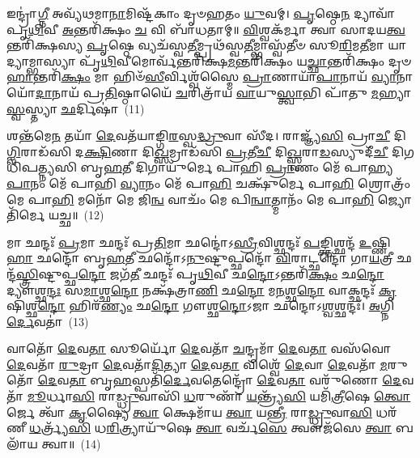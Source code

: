 {\anuvakamend[{𑌪𑍁𑌰𑍁᳴\-\ul{𑌷𑍋} 𑌵\-\ul{𑌯𑌃} 𑌷𑌡𑍍𑌵𑌿𑍞᳴𑌶𑌤𑌿𑌶𑍍𑌚}]}%

𑌇𑌨𑍍𑌦𑍍𑌰𑌾॑\-\ul{𑌗𑍍𑌨𑍀} 𑌅𑌵𑍍𑌯᳴𑌥𑌮𑌾\-\ul{𑌨𑌾}\-𑌮𑌿𑌷𑍍𑌟᳴𑌕𑌾𑌂 𑌦𑍃𑍞𑌹𑌤𑌂 \ul{𑌯𑍁}\-𑌵𑌮𑍍। \ul{𑌪𑍃}\-𑌷𑍍𑌠𑍇\-\ul{𑌨} 𑌦𑍍𑌯𑌾𑌵𑌾᳴𑌪𑍃\-\ul{𑌥𑌿}\-𑌵𑍀 \ul{𑌅}\-𑌨𑍍𑌤𑌰𑌿᳴𑌕𑍍𑌷𑌂 \ul{𑌚} 𑌵𑌿 𑌬𑌾᳴𑌧𑌤𑌾𑌮𑍍॥ \ul{𑌵𑌿}\-𑌶𑍍𑌵𑌕᳴𑌰𑍍𑌮𑌾 𑌤𑍍𑌵𑌾 𑌸𑌾𑌦𑌯\-\ul{𑌤𑍍𑌵}\-𑌨𑍍𑌤𑌰𑌿᳴𑌕𑍍𑌷𑌸𑍍𑌯 \ul{𑌪𑍃}\-𑌷𑍍𑌠𑍇 𑌵𑍍𑌯𑌚᳴𑌸𑍍𑌵\-\ul{𑌤𑍀}\-𑌮𑍍𑌪𑍍𑌰𑌥᳴𑌸𑍍𑌵\-\ul{𑌤𑍀}\-𑌮𑍍𑌭𑌾𑌸𑍍𑌵᳴𑌤𑍀𑍞 𑌸𑍂\-\ul{𑌰𑌿}\-𑌮\-\ul{𑌤𑍀}\-𑌮𑌾 𑌯𑌾 𑌦𑍍𑌯𑌾𑌮𑍍𑌭𑌾𑌸𑍍𑌯𑌾 𑌪𑍃᳴\-\ul{𑌥𑌿}\-𑌵𑍀𑌮𑍋𑌰𑍍𑌵᳴𑌨𑍍𑌤𑌰𑌿᳴𑌕𑍍𑌷\-\ul{𑌮}\-𑌨𑍍𑌤𑌰𑌿᳴𑌕𑍍𑌷𑌂 𑌯\-\ul{𑌚𑍍𑌛𑌾}\-𑌨𑍍𑌤𑌰𑌿᳴𑌕𑍍𑌷𑌂 𑌦𑍃𑍞\-\ul{𑌹𑌾}\-𑌨𑍍𑌤𑌰𑌿᳴\-\ul{𑌕𑍍𑌷𑌂} 𑌮𑌾 𑌹𑌿𑍞᳴\-\ul{𑌸𑍀}\-𑌰𑍍𑌵𑌿𑌶𑍍𑌵᳴𑌸𑍍𑌮𑍈 \ul{𑌪𑍍𑌰𑌾}\-𑌣𑌾𑌯𑌾᳴\-\ul{𑌪𑌾}\-𑌨𑌾𑌯᳴ \ul{𑌵𑍍𑌯𑌾}\-𑌨𑌾𑌯𑍋᳴\-\ul{𑌦𑌾}\-𑌨𑌾𑌯᳴ 𑌪𑍍𑌰\-\ul{𑌤𑌿}\-𑌷𑍍𑌠𑌾𑌯𑍈᳴ \ul{𑌚}\-𑌰𑌿𑌤𑍍𑌰𑌾᳴𑌯 \ul{𑌵𑌾}\-𑌯𑍁\-\ul{𑌸𑍍𑌤𑍍𑌵𑌾}\-𑌭𑌿 𑌪𑌾᳴𑌤𑍁 \ul{𑌮}\-𑌹𑍍𑌯𑌾 \ul{𑌸𑍍𑌵}\-𑌸𑍍𑌤𑍍𑌯𑌾 \ul{𑌛}\-𑌰𑍍𑌦𑌿𑌷𑌾॑~(11)

𑌶𑌨𑍍𑌤᳴𑌮𑍇\-\ul{𑌨} 𑌤𑌯𑌾᳴ \ul{𑌦𑍇}\-𑌵𑌤᳴𑌯𑌾𑌙𑍍𑌗𑌿\-\ul{𑌰}\-𑌸𑍍𑌵\-\ul{𑌦𑍍𑌧𑍍𑌰𑍁}\-𑌵𑌾 𑌸𑍀᳴𑌦। 𑌰𑌾𑌜𑍍𑌞𑍍𑌯᳴\-\ul{𑌸𑌿} 𑌪𑍍𑌰𑌾\-\ul{𑌚𑍀} 𑌦𑌿\-\ul{𑌗𑍍𑌵𑌿}\-𑌰𑌾𑌡᳴𑌸𑌿 𑌦\-\ul{𑌕𑍍𑌷𑌿}\-𑌣𑌾 𑌦𑌿\-\ul{𑌖𑍍𑌸}\-𑌮𑍍𑌰𑌾𑌡᳴𑌸𑌿 \ul{𑌪𑍍𑌰}\-𑌤𑍀\-\ul{𑌚𑍀} 𑌦𑌿\-\ul{𑌖𑍍𑌸𑍍𑌵}\-𑌰𑌾\-\ul{𑌡}\-𑌸𑍍𑌯𑍁𑌦𑍀᳴\-\ul{𑌚𑍀} 𑌦𑌿𑌗𑌧𑌿᳴𑌪𑌤𑍍𑌨𑍍𑌯𑌸𑌿 𑌬𑍃\-\ul{𑌹}\-𑌤𑍀 𑌦𑌿𑌗𑌾𑌯𑍁᳴𑌰𑍍𑌮𑍇 𑌪𑌾𑌹𑌿 \ul{𑌪𑍍𑌰𑌾}\-𑌣𑌂 𑌮𑍇᳴ 𑌪𑌾𑌹𑍍𑌯\-\ul{𑌪𑌾}\-𑌨𑌂 𑌮𑍇᳴ 𑌪𑌾𑌹𑌿 \ul{𑌵𑍍𑌯𑌾}\-𑌨𑌂 𑌮𑍇᳴ 𑌪𑌾\-\ul{𑌹𑌿} 𑌚𑌕𑍍𑌷𑍁᳴𑌰𑍍𑌮𑍇 𑌪𑌾\-\ul{𑌹𑌿} 𑌶𑍍𑌰𑍋𑌤𑍍𑌰𑌂᳴ 𑌮𑍇 𑌪𑌾\-\ul{𑌹𑌿} 𑌮𑌨𑍋᳴ 𑌮𑍇 𑌜𑌿\-\ul{𑌨𑍍𑌵} 𑌵𑌾𑌚𑌂᳴ 𑌮𑍇 𑌪𑌿\-\ul{𑌨𑍍𑌵𑌾}\-𑌤𑍍𑌮𑌾𑌨𑌂᳴ 𑌮𑍇 𑌪𑌾\-\ul{𑌹𑌿} 𑌜𑍍𑌯𑍋𑌤𑌿᳴𑌰𑍍𑌮𑍇 𑌯𑌚𑍍𑌛॥~(12)

{\anuvakamend[{\-\ul{𑌛}\-𑌰𑍍𑌦𑌿𑌷𑌾᳴ 𑌪𑌿\-\ul{𑌨𑍍𑌵} 𑌷𑌟𑍍𑌚᳴}]}%

𑌮𑌾 𑌛𑌨𑍍𑌦𑌃᳴ \ul{𑌪𑍍𑌰}\-𑌮𑌾 𑌛𑌨𑍍𑌦𑌃᳴ 𑌪𑍍𑌰\-\ul{𑌤𑌿}\-𑌮𑌾 𑌛𑌨𑍍𑌦𑍋॑\-𑌽\-\ul{𑌸𑍍𑌰𑍀}\-𑌵𑌿𑌶𑍍𑌛𑌨𑍍𑌦𑌃᳴ \ul{𑌪}\-𑌙𑍍𑌕𑍍𑌤𑌿𑌶𑍍𑌛𑌨𑍍𑌦᳴ \ul{𑌉}\-𑌷𑍍𑌣𑌿\-\ul{𑌹𑌾} 𑌛𑌨𑍍𑌦𑍋᳴ 𑌬𑍃\-\ul{𑌹}\-𑌤𑍀 𑌛𑌨𑍍𑌦𑍋᳴\-𑌽\-\ul{𑌨𑍁}\-𑌷𑍍𑌟𑍁𑌪𑍍𑌛𑌨𑍍𑌦𑍋᳴ \ul{𑌵𑌿}\-𑌰𑌾𑌟𑍍𑌛𑌨𑍍𑌦𑍋᳴ 𑌗𑌾\-\ul{𑌯}\-𑌤𑍍𑌰𑍀 𑌛𑌨𑍍𑌦᳴\-\ul{𑌸𑍍𑌤𑍍𑌰𑌿}\-𑌷𑍍𑌟𑍁𑌪𑍍𑌛\-\ul{𑌨𑍍𑌦𑍋} 𑌜𑌗᳴\-\ul{𑌤𑍀} 𑌛𑌨𑍍𑌦𑌃᳴ 𑌪𑍃\-\ul{𑌥𑌿}\-𑌵𑍀 𑌛\-\ul{𑌨𑍍𑌦𑍋}\-\-𑌽𑌨𑍍𑌤𑌰𑌿᳴\-\ul{𑌕𑍍𑌷𑌂} 𑌛\-\ul{𑌨𑍍𑌦𑍋} 𑌦𑍍𑌯𑍗𑌶𑍍𑌛\-\ul{𑌨𑍍𑌦𑌃} 𑌸\-\ul{𑌮𑌾}\-𑌶𑍍𑌛\-\ul{𑌨𑍍𑌦𑍋} 𑌨𑌕𑍍𑌷᳴𑌤𑍍𑌰𑌾\-\ul{𑌣𑌿} 𑌛\-\ul{𑌨𑍍𑌦𑍋} 𑌮\-\ul{𑌨}\-𑌶𑍍𑌛\-\ul{𑌨𑍍𑌦𑍋} 𑌵𑌾𑌕𑍍𑌛𑌨𑍍𑌦𑌃᳴ \ul{𑌕𑍃}\-𑌷𑌿𑌶𑍍𑌛\-\ul{𑌨𑍍𑌦𑍋} 𑌹𑌿𑌰᳴\-\ul{𑌣𑍍𑌯𑌂} 𑌛\-\ul{𑌨𑍍𑌦𑍋} 𑌗𑍗𑌶𑍍𑌛\-\ul{𑌨𑍍𑌦𑍋}\-\-𑌽𑌜𑌾 𑌛𑌨𑍍𑌦𑍋\-𑌽\-\ul{𑌶𑍍𑌵}\-𑌶𑍍𑌛𑌨𑍍𑌦𑌃᳴। \ul{𑌅}\-𑌗𑍍𑌨𑌿\-\ul{𑌰𑍍𑌦𑍇}\-𑌵𑌤𑌾॑~(13)

𑌵𑌾𑌤𑍋᳴ \ul{𑌦𑍇}\-𑌵\-\ul{𑌤𑌾} 𑌸𑍂𑌰𑍍𑌯𑍋᳴ \ul{𑌦𑍇}\-𑌵𑌤𑌾᳴ \ul{𑌚}\-𑌨𑍍𑌦𑍍𑌰𑌮𑌾᳴ \ul{𑌦𑍇}\-𑌵\-\ul{𑌤𑌾} 𑌵𑌸᳴𑌵𑍋 \ul{𑌦𑍇}\-𑌵𑌤𑌾᳴ \ul{𑌰𑍁}\-𑌦𑍍𑌰𑌾 \ul{𑌦𑍇}\-𑌵𑌤𑌾᳴\-\ul{𑌦𑌿}\-𑌤𑍍𑌯𑌾 \ul{𑌦𑍇}\-𑌵\-\ul{𑌤𑌾} 𑌵𑌿𑌶𑍍𑌵𑍇᳴ \ul{𑌦𑍇}\-𑌵𑌾 \ul{𑌦𑍇}\-𑌵𑌤𑌾᳴ \ul{𑌮}\-𑌰𑍁𑌤𑍋᳴ \ul{𑌦𑍇}\-𑌵\-\ul{𑌤𑌾} 𑌬𑍃\-\ul{𑌹}\-𑌸𑍍𑌪𑌤𑌿᳴\-\ul{𑌰𑍍𑌦𑍇}\-𑌵𑌤𑍇𑌨𑍍𑌦𑍍𑌰𑍋᳴ \ul{𑌦𑍇}\-𑌵\-\ul{𑌤𑌾} 𑌵𑌰𑍁᳴𑌣𑍋 \ul{𑌦𑍇}\-𑌵𑌤𑌾᳴ \ul{𑌮𑍂}\-𑌰𑍍𑌧𑌾\-\ul{𑌸𑌿} 𑌰𑌾\-\ul{𑌡𑍍𑌧𑍍𑌰𑍁}\-𑌵𑌾𑌸𑌿᳴ \ul{𑌧}\-𑌰𑍁𑌣𑌾᳴ \ul{𑌯}\-𑌨𑍍𑌤𑍍𑌰𑍍𑌯᳴\-\ul{𑌸𑌿} 𑌯𑌮𑌿᳴\-\ul{𑌤𑍍𑌰𑍀}\-𑌷𑍇 \ul{𑌤𑍍𑌵𑍋}\-𑌰𑍍𑌜𑍇 𑌤𑍍𑌵𑌾᳴ \ul{𑌕𑍃}\-𑌷𑍍𑌯𑍈 \ul{𑌤𑍍𑌵𑌾} 𑌕𑍍𑌷𑍇𑌮𑌾᳴𑌯 \ul{𑌤𑍍𑌵𑌾} 𑌯\-\ul{𑌨𑍍𑌤𑍍𑌰𑍀} 𑌰𑌾\-\ul{𑌡𑍍𑌧𑍍𑌰𑍁}\-𑌵𑌾\-\ul{𑌸𑌿} 𑌧𑌰᳴𑌣𑍀 \ul{𑌧}\-𑌰𑍍𑌤𑍍𑌰𑍍𑌯᳴\-\ul{𑌸𑌿} 𑌧\-\ul{𑌰𑌿}\-𑌤𑍍𑌰𑍍𑌯𑌾𑌯𑍁᳴𑌷𑍇 \ul{𑌤𑍍𑌵𑌾} 𑌵𑌰𑍍𑌚᳴\-\ul{𑌸𑍇} 𑌤𑍍𑌵𑍗𑌜᳴𑌸𑍇 \ul{𑌤𑍍𑌵𑌾} 𑌬𑌲𑌾᳴𑌯 𑌤𑍍𑌵𑌾॥~(14)

